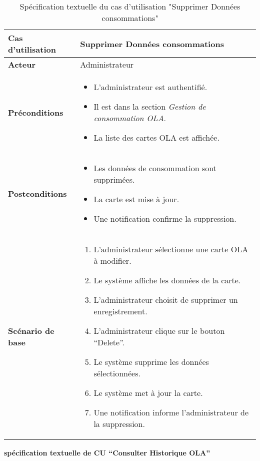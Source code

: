\documentclass[a4paper,11pt]{report}
\begin{document}
\begin{table}[H]
  \centering
  \renewcommand{\arraystretch}{1.5}
  \caption{Spécification textuelle du cas d'utilisation "Supprimer Données consommations"}
  \begin{tabularx}{\textwidth}{|l|X|}
    \hline
    \textbf{Cas d'utilisation} & Supprimer Données consommations \\ \hline
    \textbf{Acteur} & Administrateur \\ \hline
    \textbf{Préconditions} & 
    \begin{itemize}
      \item L’administrateur est authentifié.
      \item Il est dans la section \textit{Gestion de consommation OLA}.
      \item La liste des cartes OLA est affichée.
    \end{itemize} \\ \hline
    \textbf{Postconditions} & 
    \begin{itemize}
      \item Les données de consommation sont supprimées.
      \item La carte est mise à jour.
      \item Une notification confirme la suppression.
    \end{itemize} \\ \hline
    \textbf{Scénario de base} & 
    \begin{enumerate}
      \item L’administrateur sélectionne une carte OLA à modifier.
      \item Le système affiche les données de la carte.
      \item L’administrateur choisit de supprimer un enregistrement.
      \item L’administrateur clique sur le bouton “Delete”.
      \item Le système supprime les données sélectionnées.
      \item Le système met à jour la carte.
      \item Une notification informe l’administrateur de la suppression.
    \end{enumerate} \\ \hline
  \end{tabularx}
\end{table}




\textbf{spécification textuelle de CU “Consulter Historique OLA”
}
\end{document}
